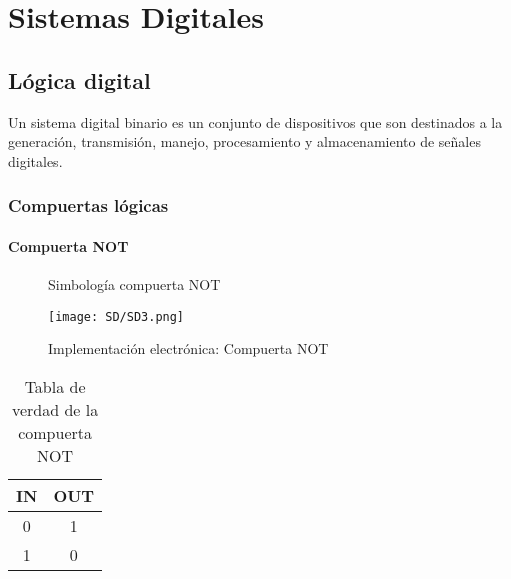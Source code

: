 \documentclass[11pt,fleqn]{book} %
\begin{document}
\part{Sistemas Digitales}
\chapter{Lógica digital}
Un sistema digital binario es un conjunto de dispositivos que son destinados a la generación, transmisión, manejo, procesamiento y almacenamiento de señales digitales.
\section{Compuertas lógicas}
\subsection{Compuerta NOT}
\begin{figure}[h!]
\centering
{}
\caption{Simbología compuerta NOT}
\end{figure}
\begin{figure}[h!]
\centering
\texttt{[image: SD/SD3.png]}
\caption{Implementación electrónica: Compuerta NOT}
\end{figure}
\begin{table}[h!]
\begin{center}
\begin{tabular}{|c|c|}
\hline
\rowcolor{color1}
IN & OUT \\ \hline
0  & 1   \\ \hline
1  & 0   \\ \hline
\end{tabular}
\end{center}
\caption{Tabla de verdad de la compuerta NOT}
\label{table:nottable}
\end{table}
\end{document}
